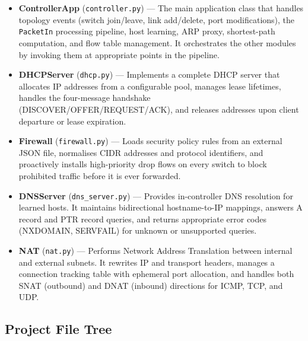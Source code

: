 \documentclass[12pt,a4paper]{article}
\begin{document}
\begin{itemize}[leftmargin=1.5cm]
    \item \textbf{ControllerApp} (\texttt{controller.py}) --- The main application class that handles topology events (switch join/leave, link add/delete, port modifications), the \texttt{PacketIn} processing pipeline, host learning, ARP proxy, shortest-path computation, and flow table management. It orchestrates the other modules by invoking them at appropriate points in the pipeline.
    \item \textbf{DHCPServer} (\texttt{dhcp.py}) --- Implements a complete DHCP server that allocates IP addresses from a configurable pool, manages lease lifetimes, handles the four-message handshake (DISCOVER/OFFER/REQUEST/ACK), and releases addresses upon client departure or lease expiration.
    \item \textbf{Firewall} (\texttt{firewall.py}) --- Loads security policy rules from an external JSON file, normalises CIDR addresses and protocol identifiers, and proactively installs high-priority drop flows on every switch to block prohibited traffic before it is ever forwarded.
    \item \textbf{DNSServer} (\texttt{dns\_server.py}) --- Provides in-controller DNS resolution for learned hosts. It maintains bidirectional hostname-to-IP mappings, answers A record and PTR record queries, and returns appropriate error codes (NXDOMAIN, SERVFAIL) for unknown or unsupported queries.
    \item \textbf{NAT} (\texttt{nat.py}) --- Performs Network Address Translation between internal and external subnets. It rewrites IP and transport headers, manages a connection tracking table with ephemeral port allocation, and handles both SNAT (outbound) and DNAT (inbound) directions for ICMP, TCP, and UDP.
\end{itemize}

\subsection{Project File Tree}
\end{document}
